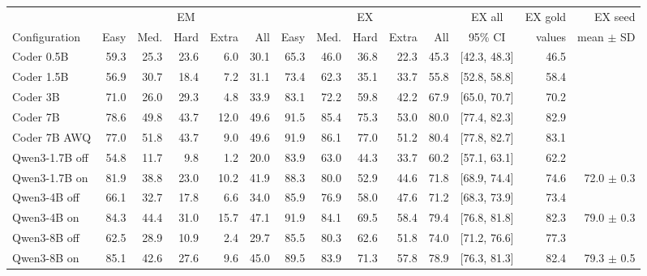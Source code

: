 \begin{tabular}{@{}l rrrrr rrrrr c r r@{}}
\toprule
 & \multicolumn{5}{c}{EM} & \multicolumn{5}{c}{EX} & EX all & EX gold & EX seed \\
\cmidrule(lr){2-6}\cmidrule(lr){7-11}
Configuration & Easy & Med. & Hard & Extra & All & Easy & Med. & Hard & Extra & All & 95\% CI & values & mean $\pm$ SD \\
\midrule
Coder 0.5B & 59.3 & 25.3 & 23.6 & 6.0 & 30.1 & 65.3 & 46.0 & 36.8 & 22.3 & 45.3 & [42.3, 48.3] & 46.5 &  \\
Coder 1.5B & 56.9 & 30.7 & 18.4 & 7.2 & 31.1 & 73.4 & 62.3 & 35.1 & 33.7 & 55.8 & [52.8, 58.8] & 58.4 &  \\
Coder 3B & 71.0 & 26.0 & 29.3 & 4.8 & 33.9 & 83.1 & 72.2 & 59.8 & 42.2 & 67.9 & [65.0, 70.7] & 70.2 &  \\
Coder 7B & 78.6 & 49.8 & 43.7 & 12.0 & 49.6 & 91.5 & 85.4 & 75.3 & 53.0 & 80.0 & [77.4, 82.3] & 82.9 &  \\
Coder 7B AWQ & 77.0 & 51.8 & 43.7 & 9.0 & 49.6 & 91.9 & 86.1 & 77.0 & 51.2 & 80.4 & [77.8, 82.7] & 83.1 &  \\
\midrule
Qwen3-1.7B off & 54.8 & 11.7 & 9.8 & 1.2 & 20.0 & 83.9 & 63.0 & 44.3 & 33.7 & 60.2 & [57.1, 63.1] & 62.2 &  \\
Qwen3-1.7B on & 81.9 & 38.8 & 23.0 & 10.2 & 41.9 & 88.3 & 80.0 & 52.9 & 44.6 & 71.8 & [68.9, 74.4] & 74.6 & 72.0 $\pm$ 0.3 \\
Qwen3-4B off & 66.1 & 32.7 & 17.8 & 6.6 & 34.0 & 85.9 & 76.9 & 58.0 & 47.6 & 71.2 & [68.3, 73.9] & 73.4 &  \\
Qwen3-4B on & 84.3 & 44.4 & 31.0 & 15.7 & 47.1 & 91.9 & 84.1 & 69.5 & 58.4 & 79.4 & [76.8, 81.8] & 82.3 & 79.0 $\pm$ 0.3 \\
Qwen3-8B off & 62.5 & 28.9 & 10.9 & 2.4 & 29.7 & 85.5 & 80.3 & 62.6 & 51.8 & 74.0 & [71.2, 76.6] & 77.3 &  \\
Qwen3-8B on & 85.1 & 42.6 & 27.6 & 9.6 & 45.0 & 89.5 & 83.9 & 71.3 & 57.8 & 78.9 & [76.3, 81.3] & 82.4 & 79.3 $\pm$ 0.5 \\
\bottomrule
\end{tabular}
